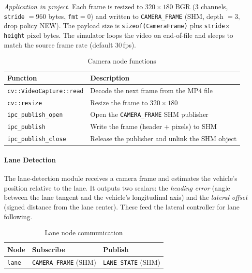 \documentclass[12pt,a4paper]{article}
\begin{document}
\textit{Application in project.}
Each frame is resized to $320 \times 180$ BGR (3 channels, \texttt{stride} $=960$
bytes, \texttt{fmt}$=0$) and written to \texttt{CAMERA\_FRAME} (SHM, depth $=3$,
drop policy NEW). The payload size is \texttt{sizeof(CameraFrame)} plus
\texttt{stride}$\times$\texttt{height} pixel bytes. The simulator loops the
video on end-of-file and sleeps to match the source frame rate (default
30\,fps).

\begin{table}[H]
\centering
\begin{tabular}{ll}
\hline
\textbf{Function} & \textbf{Description} \\
\hline
\texttt{cv::VideoCapture::read} & Decode the next frame from the MP4 file \\
\texttt{cv::resize}             & Resize the frame to $320 \times 180$ \\
\texttt{ipc\_publish\_open}     & Open the \texttt{CAMERA\_FRAME} SHM publisher \\
\texttt{ipc\_publish}           & Write the frame (header + pixels) to SHM \\
\texttt{ipc\_publish\_close}    & Release the publisher and unlink the SHM object \\
\hline
\end{tabular}
\caption{Camera node functions}
\end{table}

\paragraph{Lane Detection}

The lane-detection module receives a camera frame and estimates the vehicle's
position relative to the lane. It outputs two scalars: the \emph{heading error}
(angle between the lane tangent and the vehicle's longitudinal axis) and the
\emph{lateral offset} (signed distance from the lane center). These feed the
lateral controller for lane following.

\begin{table}[H]
\centering
\begin{tabular}{lll}
\hline
\textbf{Node} & \textbf{Subscribe} & \textbf{Publish} \\
\hline
\texttt{lane} & \texttt{CAMERA\_FRAME} (SHM) & \texttt{LANE\_STATE} (SHM) \\
\hline
\end{tabular}
\caption{Lane node communication}
\end{table}
\end{document}
